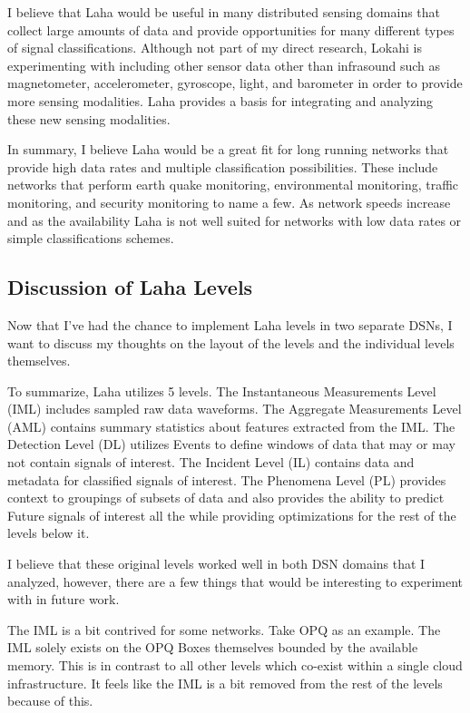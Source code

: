 I believe that Laha would be useful in many distributed sensing domains that collect large amounts of data and provide opportunities for many different types of signal classifications. Although not part of my direct research, Lokahi is experimenting with including other sensor data other than infrasound such as magnetometer, accelerometer, gyroscope, light, and barometer in order to provide more sensing modalities. Laha provides a basis for integrating and analyzing these new sensing modalities.

In summary, I believe Laha would be a great fit for long running networks that provide high data rates and multiple classification possibilities. These include networks that perform earth quake monitoring, environmental monitoring, traffic monitoring, and security monitoring to name a few. As network speeds increase and as the availability  Laha is not well suited for networks with low data rates or simple classifications schemes.

\subsection{Discussion of Laha Levels}\label{subsec:discussion-of-laha-levels}

Now that I've had the chance to implement Laha levels in two separate DSNs, I want to discuss my thoughts on the layout of the levels and the individual levels themselves.

To summarize, Laha utilizes 5 levels. The Instantaneous Measurements Level (IML) includes sampled raw data waveforms. The Aggregate Measurements Level (AML) contains summary statistics about features extracted from the IML. The Detection Level (DL) utilizes Events to define windows of data that may or may not contain signals of interest. The Incident Level (IL) contains data and metadata for classified signals of interest. The Phenomena Level (PL) provides context to groupings of subsets of data and also provides the ability to predict Future signals of interest all the while providing optimizations for the rest of the levels below it.

I believe that these original levels worked well in both DSN domains that I analyzed, however, there are a few things that would be interesting to experiment with in future work.

The IML is a bit contrived for some networks. Take OPQ as an example. The IML solely exists on the OPQ Boxes themselves bounded by the available memory. This is in contrast to all other levels which co-exist within a single cloud infrastructure. It feels like the IML is a bit removed from the rest of the levels because of this.

